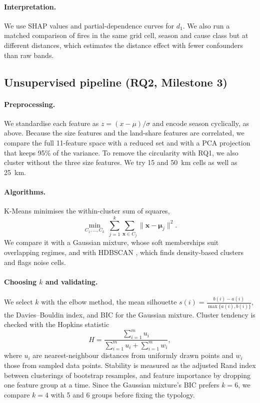 \documentclass[10pt,twocolumn,letterpaper]{article}
\begin{document}
\paragraph{Interpretation.} We use SHAP values \cite{lundberg2017} and partial-dependence curves for $d_1$. We also run a matched comparison of fires in the same grid cell, season and cause class but at different distances, which estimates the distance effect with fewer confounders than raw bands.

\subsection{Unsupervised pipeline (RQ2, Milestone 3)}
\paragraph{Preprocessing.} We standardise each feature as $z = (x-\mu)/\sigma$ and encode season cyclically, as above. Because the size features and the land-share features are correlated, we compare the full 11-feature space with a reduced set and with a PCA projection that keeps 95\% of the variance. To remove the circularity with RQ1, we also cluster without the three size features. We try 15 and 50~km cells as well as 25~km.

\paragraph{Algorithms.} K-Means minimises the within-cluster sum of squares,
\begin{equation}
\min_{C_1,\dots,C_k}\ \sum_{j=1}^{k}\sum_{\mathbf{x}\in C_j}\lVert \mathbf{x}-\boldsymbol{\mu}_j\rVert^2 .
\end{equation}
We compare it with a Gaussian mixture, whose soft memberships suit overlapping regimes, and with HDBSCAN \cite{campello2013}, which finds density-based clusters and flags noise cells.

\paragraph{Choosing $k$ and validating.} We select $k$ with the elbow method, the mean silhouette $s(i)=\frac{b(i)-a(i)}{\max\{a(i),b(i)\}}$, the Davies--Bouldin index, and BIC for the Gaussian mixture. Cluster tendency is checked with the Hopkins statistic
\begin{equation}
H = \frac{\sum_{i=1}^{m} u_i}{\sum_{i=1}^{m} u_i + \sum_{i=1}^{m} w_i},
\end{equation}
where $u_i$ are nearest-neighbour distances from uniformly drawn points and $w_i$ those from sampled data points. Stability is measured as the adjusted Rand index between clusterings of bootstrap resamples, and feature importance by dropping one feature group at a time. Since the Gaussian mixture's BIC prefers $k=6$, we compare $k=4$ with 5 and 6 groups before fixing the typology.
\end{document}
